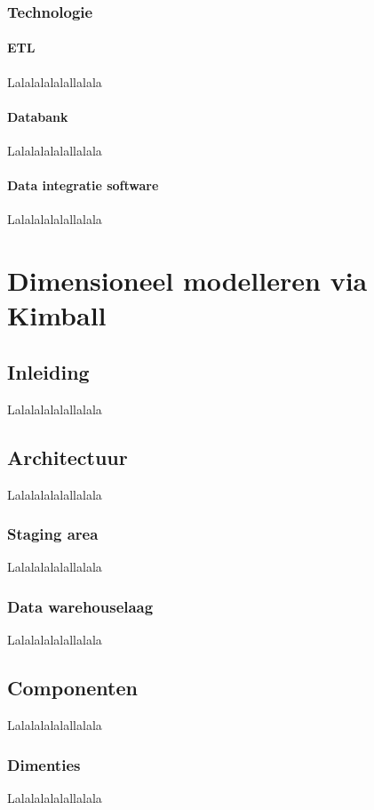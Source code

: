 \subsubsection{Technologie}
\paragraph{ETL}
\label{sec:etl}
Lalalalalalallalala

\paragraph{Databank}
Lalalalalalallalala

\paragraph{Data integratie software}
Lalalalalalallalala

\section{Dimensioneel modelleren via Kimball}

\subsection{Inleiding}
Lalalalalalallalala

\subsection{Architectuur}
Lalalalalalallalala

\subsubsection{Staging area}
Lalalalalalallalala

\subsubsection{Data warehouselaag}
Lalalalalalallalala

\subsection{Componenten}
Lalalalalalallalala

\subsubsection{Dimenties}
Lalalalalalallalala

